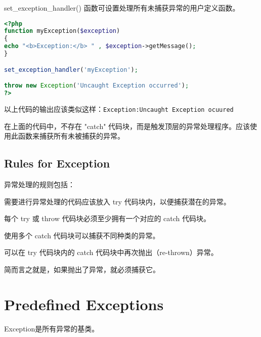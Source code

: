 set\_exception\_handler() 函数可设置处理所有未捕获异常的用户定义函数。

\begin{lstlisting}[language=PHP]
<?php
function myException($exception)
{
echo "<b>Exception:</b> " , $exception->getMessage();
}

set_exception_handler('myException');

throw new Exception('Uncaught Exception occurred');
?>
\end{lstlisting}

以上代码的输出应该类似这样：\verb|Exception:Uncaught Exception ocuured|

在上面的代码中，不存在 "catch" 代码块，而是触发顶层的异常处理程序。应该使用此函数来捕获所有未被捕获的异常。





\section{Rules for Exception}

异常处理的规则包括：

\begin{compactitem}
\item 需要进行异常处理的代码应该放入 try 代码块内，以便捕获潜在的异常。
\item 每个 try 或 throw 代码块必须至少拥有一个对应的 catch 代码块。
\item 使用多个 catch 代码块可以捕获不同种类的异常。
\item 可以在 try 代码块内的 catch 代码块中再次抛出（re-thrown）异常。
\end{compactitem}

简而言之就是，如果抛出了异常，就必须捕获它。


\chapter{Predefined Exceptions}


Exception是所有异常的基类。




